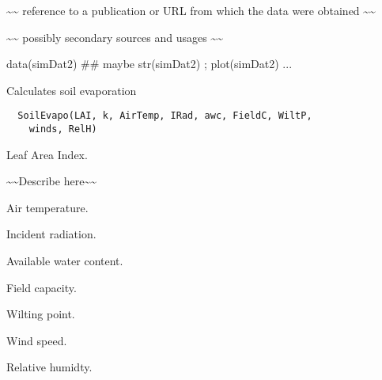 \documentclass[letterpaper]{book}
\begin{document}
%
\begin{Source}\relax
\textasciitilde{}\textasciitilde{} reference to a publication or URL from which the data
were obtained \textasciitilde{}\textasciitilde{}
\end{Source}
%
\begin{References}\relax
\textasciitilde{}\textasciitilde{} possibly secondary sources and usages \textasciitilde{}\textasciitilde{}
\end{References}
%
\begin{Examples}
\begin{ExampleCode}
data(simDat2)
## maybe str(simDat2) ; plot(simDat2) ...
\end{ExampleCode}
\end{Examples}
%
\begin{Description}\relax
Calculates soil evaporation
\end{Description}
%
\begin{Usage}
\begin{verbatim}
  SoilEvapo(LAI, k, AirTemp, IRad, awc, FieldC, WiltP,
    winds, RelH)
\end{verbatim}
\end{Usage}
%
\begin{Arguments}
\begin{ldescription}
\item[\code{LAI}] Leaf Area Index.

\item[\code{k}] \textasciitilde{}\textasciitilde{}Describe  here\textasciitilde{}\textasciitilde{}

\item[\code{AirTemp}] Air temperature.

\item[\code{IRad}] Incident radiation.

\item[\code{awc}] Available water content.

\item[\code{FieldC}] Field capacity.

\item[\code{WiltP}] Wilting point.

\item[\code{winds}] Wind speed.

\item[\code{RelH}] Relative humidty.
\end{ldescription}
\end{Arguments}
\end{document}
